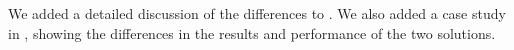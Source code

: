 \documentclass[main.tex]{subfile}
\begin{document}
We added a detailed discussion of the differences to  . We also added a case study in , showing the differences in the results and performance of the two solutions.


\end{document}

